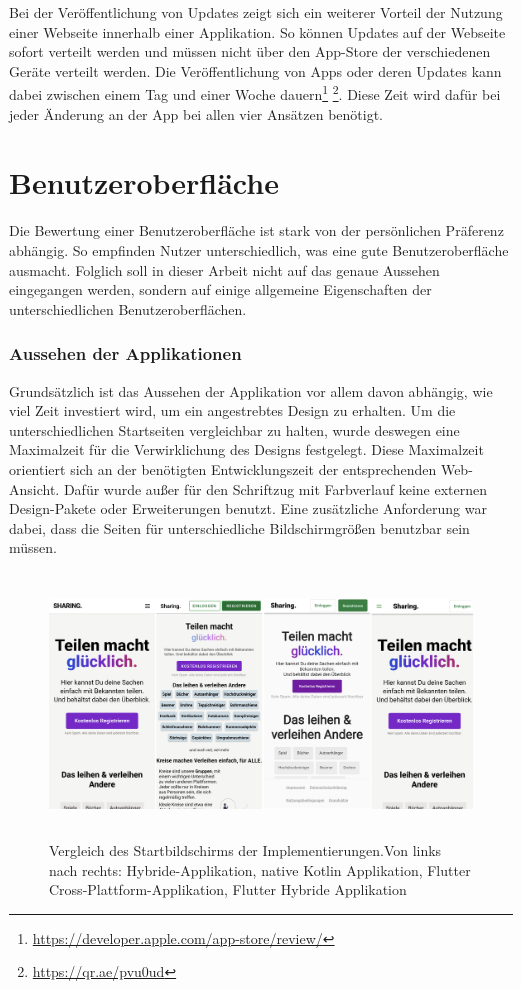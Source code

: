 Bei der Veröffentlichung von Updates zeigt sich ein weiterer Vorteil der Nutzung einer Webseite innerhalb einer Applikation. So können Updates auf der Webseite sofort verteilt werden und müssen nicht über den App-Store der verschiedenen Geräte verteilt werden. Die Veröffentlichung von Apps oder deren Updates kann dabei zwischen einem Tag und einer Woche dauern\footnote{\url{https://developer.apple.com/app-store/review/}} \footnote{\url{https://qr.ae/pvu0ud}}. Diese Zeit wird dafür bei jeder Änderung an der App bei allen vier Ansätzen benötigt.

\section{Benutzeroberfläche}
Die Bewertung einer Benutzeroberfläche ist stark von der persönlichen Präferenz abhängig. So empfinden Nutzer unterschiedlich, was eine gute Benutzeroberfläche ausmacht. Folglich soll in dieser Arbeit nicht auf das genaue Aussehen eingegangen werden, sondern auf einige allgemeine Eigenschaften der unterschiedlichen Benutzeroberflächen.

\subsubsection{Aussehen der Applikationen}
Grundsätzlich ist das Aussehen der Applikation vor allem davon abhängig, wie viel Zeit investiert wird, um ein angestrebtes Design zu erhalten. Um die unterschiedlichen Startseiten vergleichbar zu halten, wurde deswegen eine Maximalzeit für die Verwirklichung des Designs festgelegt. Diese Maximalzeit orientiert sich an der benötigten Entwicklungszeit der entsprechenden Web-Ansicht. Dafür wurde außer für den Schriftzug mit Farbverlauf keine externen Design-Pakete oder Erweiterungen benutzt. Eine zusätzliche Anforderung war dabei, dass die Seiten für unterschiedliche Bildschirmgrößen benutzbar sein müssen.

\begin{figure}[ht]
  \centering
  \includegraphics[height=7cm,keepaspectratio]{images/Startbildschirm_vergleich.png} 
  \caption[Vergleich des Startbildschirms der Implementierungen]{Vergleich des Startbildschirms der Implementierungen.\break Von links nach rechts: Hybride-Applikation, native Kotlin Applikation, Flutter Cross-Plattform-Applikation, Flutter Hybride Applikation}
  \label{fig:startscreen}
\end{figure}

